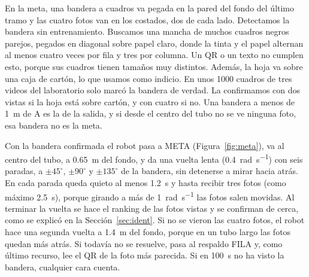 \documentclass[11pt,a4paper]{article}
\begin{document}
En la meta, una bandera a cuadros va pegada en la pared del fondo del último tramo y las cuatro fotos van en los costados, dos de cada lado. Detectamos la bandera sin entrenamiento. Buscamos una mancha de muchos cuadros negros parejos, pegados en diagonal sobre papel claro, donde la tinta y el papel alternan al menos cuatro veces por fila y tres por columna. Un QR o un texto no cumplen esto, porque sus cuadros tienen tamaños muy distintos. Además, la hoja va sobre una caja de cartón, lo que usamos como indicio. En unos 1000 cuadros de tres videos del laboratorio solo marcó la bandera de verdad. La confirmamos con dos vistas si la hoja está sobre cartón, y con cuatro si no. Una bandera a menos de \SI{1}{\meter} de A es la de la salida, y si desde el centro del tubo no se ve ninguna foto, esa bandera no es la meta.

Con la bandera confirmada el robot pasa a META (Figura~\ref{fig:meta}), va al centro del tubo, a \SI{0,65}{\meter} del fondo, y da una vuelta lenta (\SI{0,4}{\radian\per\second}) con seis paradas, a $\pm45^\circ$, $\pm90^\circ$ y $\pm135^\circ$ de la bandera, sin detenerse a mirar hacia atrás. En cada parada queda quieto al menos \SI{1,2}{\second} y hasta recibir tres fotos (como máximo \SI{2,5}{\second}), porque girando a más de \SI{1}{\radian\per\second} las fotos salen movidas. Al terminar la vuelta se hace el ranking de las fotos vistas y se confirman de cerca, como se explicó en la Sección~\ref{sec:ident}. Si no se vieron las cuatro fotos, el robot hace una segunda vuelta a \SI{1,4}{\meter} del fondo, porque en un tubo largo las fotos quedan más atrás. Si todavía no se resuelve, pasa al respaldo FILA y, como último recurso, lee el QR de la foto más parecida. Si en \SI{100}{\second} no ha visto la bandera, cualquier cara cuenta.
\end{document}
